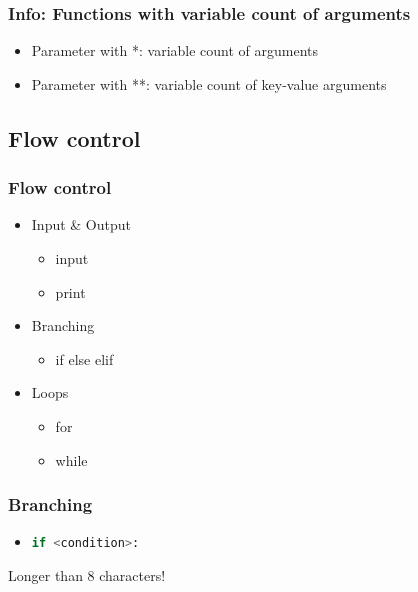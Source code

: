 \documentclass[english]{beamer}
\newcommand{\ta}[1]{\textattachfile[color=1 0 0]{#1}{Code}}
\begin{document}
\begin{frame}
\frametitle{Info: Functions with variable count of arguments}

\begin{itemize}
\item Parameter with *: variable count of arguments
\item Parameter with **: variable count of key-value arguments
\end{itemize}





\end{frame}


\subsection{Flow control}

\begin{frame}
\frametitle{Flow control}

\begin{itemize}
\item Input \& Output \checkmark
\begin{itemize}
	\item input
	\item print
\end{itemize}

\item Branching
\begin{itemize}
	\item if else elif
\end{itemize}

\item Loops
\begin{itemize}
	\item for
	\item while
\end{itemize}

\end{itemize}
\end{frame}

\begin{frame}[containsverbatim]
\frametitle{Branching}

\begin{itemize}
\item \lstinline[language={Python}]{if <condition>:}
\end{itemize}



\begin{ausgabe}
Longer than 8 characters!
\end{ausgabe}
\end{frame}
\end{document}
